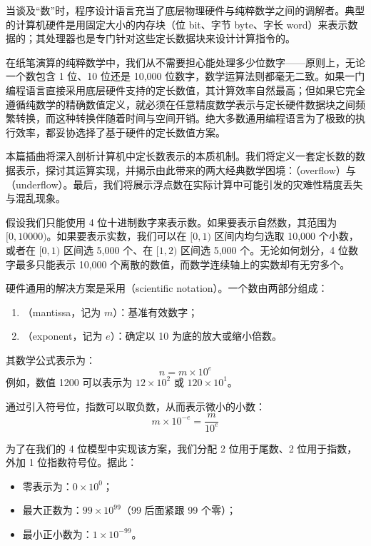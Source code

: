 
\label{sec:intermezzo04}

当谈及“数”时，程序设计语言充当了底层物理硬件与纯粹数学之间的调解者。典型的计算机硬件是用固定大小的内存块（位 bit、字节 byte、字长 word）来表示数据的；其处理器也是专门针对这些定长数据块来设计计算指令的。

在纸笔演算的纯粹数学中，我们从不需要担心能处理多少位数字——原则上，无论一个数包含 1 位、10 位还是 10,000 位数字，数学运算法则都毫无二致。如果一门编程语言直接采用底层硬件支持的定长数值，其计算效率自然最高；但如果它完全遵循纯数学的精确数值定义，就必须在任意精度数学表示与定长硬件数据块之间频繁转换，而这种转换伴随着时间与空间开销。绝大多数通用编程语言为了极致的执行效率，都妥协选择了基于硬件的定长数值方案。

本篇插曲将深入剖析计算机中定长数表示的本质机制。我们将定义一套定长数的数据表示，探讨其运算实现，并揭示由此带来的两大经典数学困境：（overflow）与（underflow）。最后，我们将展示浮点数在实际计算中可能引发的灾难性精度丢失与混乱现象。

\label{sec:int4_fixed_size}

假设我们只能使用 4 位十进制数字来表示数。如果要表示自然数，其范围为 $[0, 10000)$。如果要表示实数，我们可以在 $[0, 1)$ 区间内均匀选取 10,000 个小数，或者在 $[0, 1)$ 区间选 5,000 个、在 $[1, 2)$ 区间选 5,000 个。无论如何划分，4 位数字最多只能表示 10,000 个离散的数值，而数学连续轴上的实数却有无穷多个。

硬件通用的解决方案是采用（scientific notation）。一个数由两部分组成：
\begin{enumerate}
  \item {}（mantissa，记为 $m$）：基准有效数字；
  \item {}（exponent，记为 $e$）：确定以 10 为底的放大或缩小倍数。
\end{enumerate}

其数学公式表示为：
\[
n = m \times 10^e
\]
例如，数值 1200 可以表示为 $12 \times 10^2$ 或 $120 \times 10^1$。

通过引入符号位，指数可以取负数，从而表示微小的小数：
\[
m \times 10^{-e} = \frac{m}{10^e}
\]

为了在我们的 4 位模型中实现该方案，我们分配 2 位用于尾数、2 位用于指数，外加 1 位指数符号位。据此：
\begin{itemize}
  \item 零表示为：$0 \times 10^0$；
  \item 最大正数为：$99 \times 10^{99}$（99 后面紧跟 99 个零）；
  \item 最小正小数为：$1 \times 10^{-99}$。
\end{itemize}

